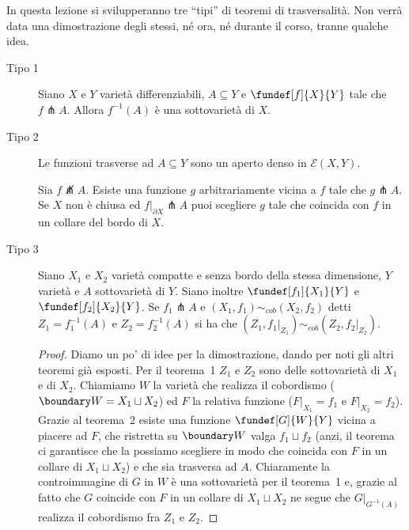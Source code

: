 
In questa lezione si svilupperanno tre ``tipi'' di teoremi di trasversalità. Non verrà data una dimostrazione degli stessi, né ora, né durante il corso, tranne qualche idea.

\begin{description}
\item [Tipo 1] %
\begin{teo}[Teorema 1]
Siano $X$ e $Y$ varietà differenziabili, $A\subseteq Y$ e $\fundef[f]{X}{Y}$  tale che $f\pitchfork A$. Allora $f^{-1}(A)$ è una sottovarietà di $X$.
\end{teo}
\item [Tipo 2] %
\begin{teo}[Teorema 2]
Le funzioni trasverse ad $A\subseteq Y$ sono un aperto denso in $\mathcal E(X,Y)$.
\end{teo}
\begin{teo}[Teorema 2++] \footnotemark %
Sia $f \not\pitchfork A$. Esiste una funzione $g$ arbitrariamente vicina a $f$ tale che $g\pitchfork A$. Se $X$ non è chiusa ed $f|_{\partial X} \pitchfork A$ puoi scegliere $g$ tale che coincida con $f$ in un collare del bordo di $X$.
\end{teo}
\item [Tipo 3] %
\begin{teo}[Teorema 3]
Siano $X_1$ e $X_2$ varietà compatte e senza bordo della stessa dimensione, $Y$ varietà e $A$ sottovarietà di $Y$. Siano inoltre $\fundef[f_1]{X_1}{Y}$ e $\fundef[f_2]{X_2}{Y}$. Se $f_1 \pitchfork A$ e $(X_1,f_1) \sim_{cob} (X_2,f_2)$ detti $Z_1=f_1^{-1}(A)$ e $Z_2=f_2^{-1}(A)$ si ha che $(Z_1, f_1|_{Z_1}) \sim_{cob} (Z_2,f_2|_{Z_2})$.
\end{teo}
\begin{proof}
 Diamo un po' di idee per la dimostrazione, dando per noti gli altri teoremi già esposti. Per il teorema~1 $Z_1$ e $Z_2$ sono delle sottovarietà di $X_1$ e di $X_2$. Chiamiamo $W$ la varietà che realizza il cobordismo ($\boundary W = X_1 \sqcup X_2$) ed $F$ la relativa funzione ($F|_{X_1} = f_1$ e $F|_{X_2}=f_2$). Grazie al teorema~2 esiste una funzione $\fundef[G]{W}{Y}$ vicina a piacere ad $F$, che ristretta su $\boundary W$ valga $f_1\sqcup f_2$ (anzi, il teorema ci garantisce che la possiamo scegliere in modo che coincida con $F$ in un collare di $X_1\sqcup X_2$) e che sia trasversa ad $A$. Chiaramente la controimmagine di $G$ in $W$ è una sottovarietà per il teorema~1 e, grazie al fatto che $G$ coincide con $F$ in un collare di $X_1 \sqcup X_2$ ne segue che $G|_{G^{-1}(A)}$ realizza il cobordismo fra $Z_1$ e $Z_2$.
 \end{proof}
\end{description}

